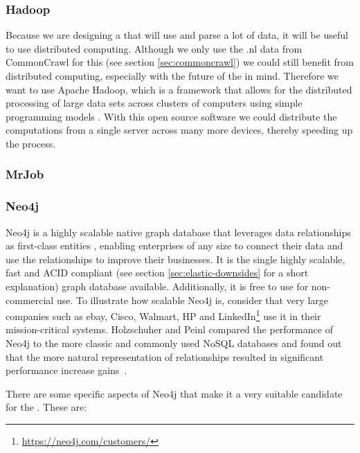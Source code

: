 \subsubsection{Hadoop}
Because we are designing a  that will use and parse a lot of data, it will be useful to use distributed computing. Although we only use the .nl data  from CommonCrawl for this  (see section \ref{sec:commoncrawl}) we could still benefit from distributed computing, especially with the future of the  in mind. 
Therefore we want to use Apache Hadoop, which is a framework that allows for the distributed processing of large data sets across clusters of computers using simple programming models \cite{Hadoop}. With this open source software we could distribute the computations from a single server across many more devices, thereby speeding up the process. 

\subsubsection{MrJob}

\subsubsection{Neo4j}
Neo4j is a highly scalable native graph database that leverages data relationships as first-class entities \cite{neo4j}, enabling enterprises of any size to connect their data and use the relationships to improve their businesses. It is the single highly scalable, fast and ACID compliant (see section \ref{sec:elastic-downsides} for a short explanation) graph database available. Additionally, it is free to use for non-commercial use. To illustrate how scalable Neo4j is, consider that very large companies such as ebay, Cisco, Walmart, HP and LinkedIn\footnote{\url{https://neo4j.com/customers/}} use it in their mission-critical systems. Holzschuher and Peinl compared the performance of Neo4j to the more classic and commonly used NoSQL databases and found out that the more natural representation of relationships resulted in significant performance increase gains~\cite{holzschuher2013performance}.

There are some specific aspects of Neo4j that make it a very suitable candidate for the . These are:

